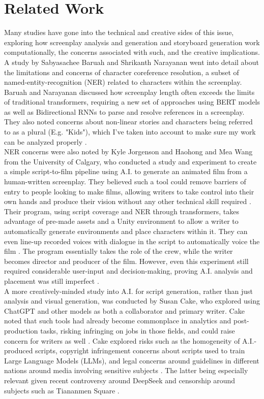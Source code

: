 \documentclass[sigconf]{acmart}
\begin{document}
\section{Related Work}
\indent Many studies have gone into the technical and creative sides of this issue, exploring how screenplay analysis and generation and storyboard generation work computationally, the concerns associated with such, and the creative implications. A study by Sabyasachee Baruah and Shrikanth Narayanan went into detail about the limitations and concerns of character coreference resolution, a subset of named-entity-recognition (NER) related to characters within the screenplay. Baruah and Narayanan discussed how screenplay length often exceeds the limits of traditional transformers, requiring a new set of approaches using BERT models as well as Bidirectional RNNs to parse and resolve references in a screenplay. They also noted concerns about non-linear stories and characters being referred to as a plural (E.g. "Kids"), which I've taken into account to make sure my work can be analyzed properly \cite{baruah-narayanan-2023-character}.\\
\indent NER concerns were also noted by Kyle Jorgenson and Haohong and Mea Wang from the University of Calgary, who conducted a study and experiment to create a simple script-to-film pipeline using A.I. to generate an animated film from a human-written screenplay. They believed such a tool could remove barriers of entry to people looking to make films, allowing writers to take control into their own hands and produce their vision without any other technical skill required \cite{10074526}. Their program, using script coverage and NER through transformers, takes advantage of pre-made assets and a Unity environment to allow a writer to automatically generate environments and place characters within it. They can even line-up recorded voices with dialogue in the script to automatically voice the film \cite{10074526}. The program essentially takes the role of the crew, while the writer becomes director and producer of the film. However, even this experiment still required considerable user-input and decision-making, proving A.I. analysis and placement was still imperfect \cite{10074526}.\\
\indent A more creatively-minded study into A.I. for script generation, rather than just analysis and visual generation, was conducted by Susan Cake, who explored using ChatGPT and other models as both a collaborator and primary writer. Cake noted that such tools had already become commonplace in analytics and post-production tasks, risking infringing on jobs in those fields, and could raise concern for writers as well \cite{Cake20012025}. Cake explored risks such as the homogeneity of A.I.-produced scripts, copyright infringement concerns about scripts used to train Large Language Models (LLMs), and legal concerns around guidelines in different nations around media involving sensitive subjects \cite{Cake20012025}. The latter being especially relevant given recent controversy around DeepSeek and censorship around subjects such as Tiananmen Square \cite{Lu_2025}.\\
\end{document}
